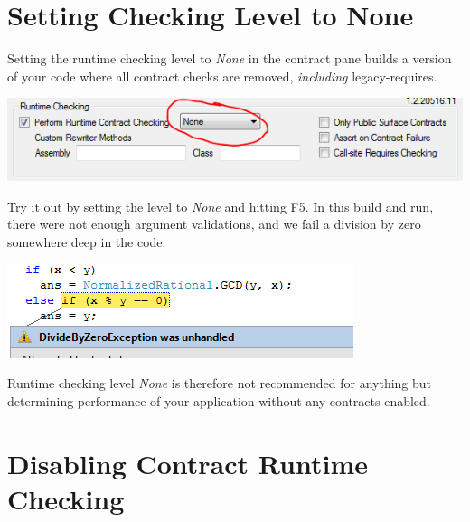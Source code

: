 \documentclass{article}
\begin{document}
\section{Setting Checking Level to None}
Setting the runtime checking level to \emph{None} in the contract pane
builds a version of your code where all contract checks are removed,
\emph{including} legacy-requires. 
\begin{center}
  \includegraphics[width=.8\columnwidth]{ex8.png}
\end{center}
Try it out by setting the level to
\emph{None} and hitting F5. In this build and run, there were not
enough argument validations, and we fail a division by zero somewhere
deep in the code.
\begin{center}
  \includegraphics[width=.8\columnwidth]{ex9.png}
\end{center}
Runtime checking level \emph{None} is therefore not recommended for
anything but determining performance of your application without any
contracts enabled.

\section{Disabling Contract Runtime Checking}
\end{document}
